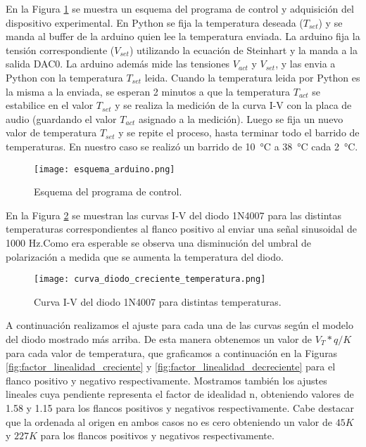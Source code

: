 \documentclass[a4paper, 11pt]{article}
\begin{document}
En la Figura \ref{fig:esquema_arduino} se muestra un esquema del programa de control y adquisición del dispositivo experimental. En Python se fija la temperatura deseada ($T_{set}$) y se manda al buffer de la arduino quien lee la temperatura enviada. La arduino fija la tensión correspondiente  ($V_{set}$) utilizando la ecuación de Steinhart y la manda a la salida DAC0. La arduino además mide las tensiones $V_{act}$ y $V_{set}$, y las envia a Python con la temperatura $T_{set}$ leida. Cuando la temperatura leida por Python es la misma a la enviada, se esperan 2 minutos  a que la temperatura $T_{act}$ se estabilice en el valor $T_{set}$ y se realiza la medición de la curva I-V con la placa de audio (guardando el valor $T_{act}$ asignado a la medición). Luego se fija un nuevo valor de temperatura  $T_{set}$ y se repite el proceso, hasta terminar todo el barrido de temperaturas. En nuestro caso se realizó un barrido de \SI{10}{\celsius}  a \SI{38}{\celsius} cada \SI{2}{\celsius}.

\begin{figure} [H]
\centering
\texttt{[image: esquema\_arduino.png]}
\caption{ Esquema del programa de control. \label{fig:esquema_arduino}}
\end{figure} 

En la Figura \ref{fig:curva_diodo_creciente_temperatura} se muestran las curvas I-V del diodo 1N4007 para las distintas temperaturas correspondientes al flanco positivo al enviar una señal sinusoidal de 1000 Hz.Como era esperable se observa una disminución del umbral de polarización a medida que se aumenta la temperatura del diodo.

\begin{figure} [H]
\centering
\texttt{[image: curva\_diodo\_creciente\_temperatura.png]}
\caption{Curva I-V del diodo 1N4007 para distintas temperaturas. \label{fig:curva_diodo_creciente_temperatura}}
\end{figure} 

A continuación realizamos el ajuste para cada una de las curvas según el modelo del diodo mostrado más arriba. De esta manera obtenemos un valor de $V_T*q/K$ para cada valor de temperatura, que graficamos a continuación en la Figuras \ref{fig:factor_linealidad_creciente} y \ref{fig:factor_linealidad_decreciente} para el flanco positivo y negativo respectivamente. Mostramos también los ajustes lineales cuya pendiente representa el factor de idealidad n, obteniendo valores de 1.58 y 1.15 para los flancos positivos y negativos respectivamente. Cabe destacar que la ordenada al origen en ambos casos no es cero obteniendo un valor de $45 K$ y $227 K$ para los flancos positivos y negativos respectivamente.
\end{document}
